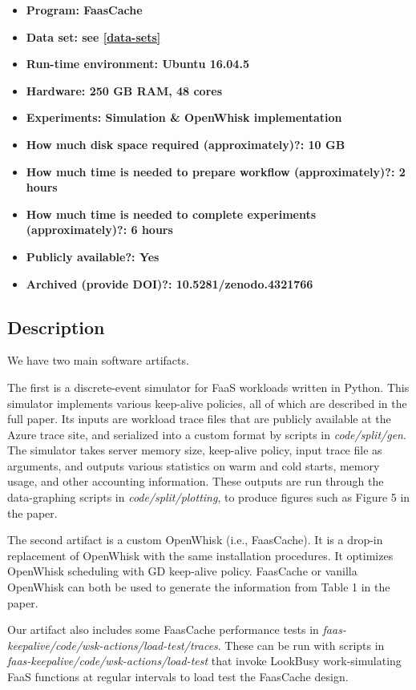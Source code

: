 {\small
\begin{itemize}
  \item {\bf Program: FaasCache }
  \item {\bf Data set: see \ref{data-sets} }
  \item {\bf Run-time environment:  Ubuntu 16.04.5 }
  \item {\bf Hardware: 250 GB RAM, 48 cores }
  \item {\bf Experiments: Simulation \& OpenWhisk implementation }
  \item {\bf How much disk space required (approximately)?: 10 GB }
  \item {\bf How much time is needed to prepare workflow (approximately)?: 2 hours }
  \item {\bf How much time is needed to complete experiments (approximately)?: 6 hours }
  \item {\bf Publicly available?: Yes }
  \item {\bf Archived (provide DOI)?: 10.5281/zenodo.4321766 }
\end{itemize}

\subsection{Description}

We have two main software artifacts.

The first is a discrete-event simulator for FaaS workloads written in Python.
This simulator implements various keep-alive policies, all of which are described in the full paper.
Its inputs are workload trace files that are publicly available at the Azure trace site, and serialized into a custom format by scripts in {\em code/split/gen}.
The simulator takes server memory size, keep-alive policy, input trace file as arguments, and outputs various statistics on warm and cold starts, memory usage, and other accounting information. 
These outputs are run through the data-graphing scripts in {\em code/split/plotting}, to produce figures such as Figure 5 in the paper.

The second artifact is a custom OpenWhisk (i.e., FaasCache).
It is a drop-in replacement of OpenWhisk with the same installation procedures.
It optimizes OpenWhisk scheduling with GD keep-alive policy.
FaasCache or vanilla OpenWhisk can both be used to generate the information from Table 1 in the paper.

Our artifact also includes some FaasCache performance tests in {\em faas-keepalive/code/wsk-actions/load-test/traces}.
These can be run with scripts in {\em faas-keepalive/code/wsk-actions/load-test} that invoke LookBusy work-simulating FaaS functions at regular intervals to load test the FaasCache design.

}
